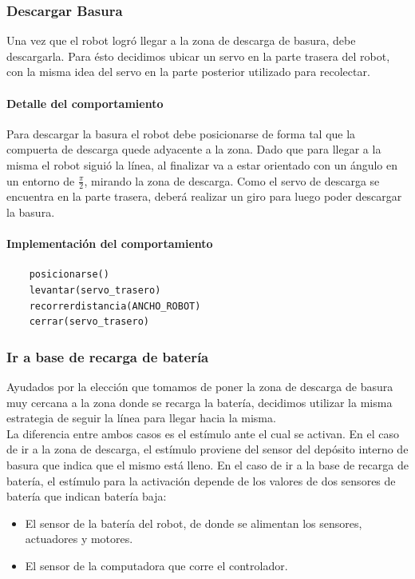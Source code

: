 \subsubsection{Descargar Basura}
\label{unload_garbage}
Una vez que el robot logr\'o llegar a la zona de descarga de basura, debe
descargarla. Para \'esto decidimos ubicar un servo en la parte trasera del robot,
con la misma idea del servo en la parte posterior utilizado para recolectar.

\paragraph{Detalle del comportamiento}
Para descargar la basura el robot debe posicionarse de forma tal que la compuerta
de descarga quede adyacente a la zona. Dado que para llegar a la misma el robot
sigui\'o la l\'inea, al finalizar va a estar orientado con un \'angulo en un
entorno de $\frac{\pi}{2}$, mirando la zona de descarga. Como el servo de descarga
se encuentra en la parte trasera, deber\'a realizar un giro para luego poder descargar
la basura.
\paragraph{Implementaci\'on del comportamiento}
\begin{verbatim}
    posicionarse()
    levantar(servo_trasero)
    recorrerdistancia(ANCHO_ROBOT)
    cerrar(servo_trasero)
\end{verbatim}

\subsubsection{Ir a base de recarga de bater\'ia}
\label{go_to_recharge}
Ayudados por la elecci\'on que tomamos de poner la zona de descarga de basura
muy cercana a la zona donde se recarga la bater\'ia, decidimos utilizar la
misma estrategia de seguir la l\'inea para llegar hacia la misma.
\\
La diferencia
entre ambos casos es el est\'imulo ante el cual se activan. En el caso de
ir a la zona de descarga, el est\'imulo proviene del sensor del dep\'osito
interno de basura que indica que el mismo est\'a lleno. En el caso de ir
a la base de recarga de bater\'ia, el est\'imulo para la activaci\'on depende
de los valores de dos sensores de bater\'ia que indican bater\'ia baja:
\begin{itemize}
	\item El sensor de la bater\'ia del robot, de donde se alimentan los sensores,
			actuadores y motores.
	\item El sensor de la computadora que corre el controlador.
\end{itemize}

